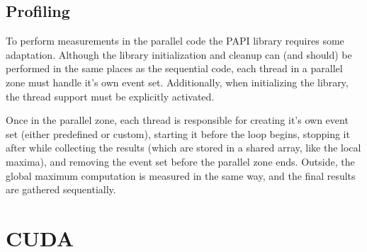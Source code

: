 \documentclass[9pt,twocolumn]{scrartcl}
\begin{document}
\subsection{Profiling}
%
%

To perform measurements in the parallel code the PAPI library requires some adaptation. Although the library initialization and cleanup can (and should) be performed in the same places as the sequential code, each thread in a parallel zone must handle it's own event set. Additionally, when initializing the library, the thread support must be explicitly activated.

Once in the parallel zone, each thread is responsible for creating it's own event set (either predefined or custom), starting it before the loop begins, stopping it after while collecting the results (which are stored in a shared array, like the local maxima), and removing the event set before the parallel zone ends. Outside, the global maximum computation is measured in the same way, and the final	 results are gathered sequentially.


\section{CUDA}
\label{sec:cuda}
\end{document}
